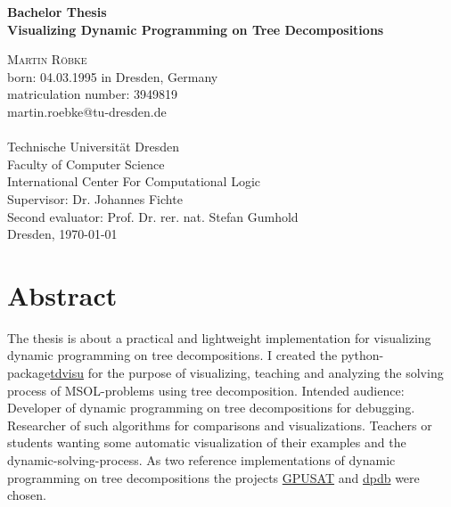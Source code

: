 \documentclass[a4paper, 12pt]{scrartcl}
\begin{document}
\begin{titlepage}
	\begin{center}
		{\Large\bfseries Bachelor Thesis}           \\[6.5ex]
		
		{\huge\bfseries Visualizing Dynamic Programming on Tree Decompositions}                  \\[6.5ex]
		
		\vspace{6ex}
				
		\textsc{\Large Martin Röbke}    \\[3ex]
		{\Large born: 04.03.1995 in Dresden, Germany}    \\[2ex]
		{\Large matriculation number: 3949819}    \\[2ex]
		{\Large martin.roebke@tu-dresden.de}    \\[2ex]
		\textsc{\large 
			}             \\[12ex]
		\vfill
		{\Large Technische Universität Dresden}               \\
		Faculty of Computer Science \\
		International Center For Computational Logic 		\\[5ex]
		
		{\Large Supervisor: Dr. Johannes Fichte}\\[2ex]
		{\Large Second evaluator:  Prof. Dr. rer. nat. Stefan Gumhold}\\[5ex]
		
		\vfill
		Dresden, \today
	\end{center}
\end{titlepage}



\section*{Abstract}
\vspace{4ex}
The thesis is about a practical and lightweight implementation for visualizing dynamic programming on tree decompositions.
I created the python-package\href{https://pypi.org/project/tdvisu}{tdvisu} for the purpose of visualizing, teaching and analyzing the solving process of MSOL-problems using tree decomposition. 
Intended audience: Developer of dynamic programming on tree decompositions for debugging. Researcher of such algorithms for comparisons and visualizations.
Teachers or students wanting some automatic visualization of their examples and the dynamic-solving-process.
As two reference implementations of dynamic programming on tree decompositions the projects \href{https://github.com/daajoe/GPUSAT}{GPUSAT} and \href{https://github.com/hmarkus/dp_on_dbs}{dpdb} were chosen.
\end{document}
